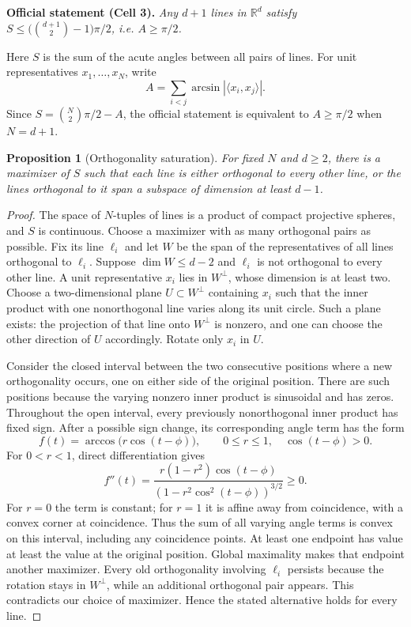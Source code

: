 \documentclass[11pt]{article}
\newtheorem{proposition}{Proposition}
\begin{document}
\noindent\textbf{Official statement (Cell 3).}
\emph{Any $d+1$ lines in $\mathbb R^d$ satisfy
$S\leq\bigl(\binom{d+1}{2}-1\bigr)\pi/2$, i.e. $A\geq\pi/2$.}

\bigskip
\noindent Here $S$ is the sum of the acute angles between all pairs
of lines.  For unit representatives $x_1,\ldots,x_N$, write
\[
 A=\sum_{i<j}\arcsin|\langle x_i,x_j\rangle|.
\]
Since $S=\binom N2\pi/2-A$, the official statement is equivalent to
$A\geq\pi/2$ when $N=d+1$.

\begin{proposition}[Orthogonality saturation]
For fixed $N$ and $d\geq2$, there is a maximizer of $S$ such that
each line is either orthogonal to every other line, or the lines
orthogonal to it span a subspace of dimension at least $d-1$.
\end{proposition}
\begin{proof}
The space of $N$-tuples of lines is a product of compact projective
spheres, and $S$ is continuous.  Choose a maximizer with as many
orthogonal pairs as possible.  Fix its line $\ell_i$ and let $W$ be
the span of the representatives of all lines orthogonal to $\ell_i$.
Suppose $\dim W\leq d-2$ and $\ell_i$ is not orthogonal to every other
line.  A unit representative $x_i$ lies in $W^\perp$, whose dimension
is at least two.  Choose a two-dimensional plane $U\subset W^\perp$
containing $x_i$ such that the inner product with one nonorthogonal
line varies along its unit circle.  Such a plane exists: the
projection of that line onto $W^\perp$ is nonzero, and one can choose
the other direction of $U$ accordingly.  Rotate only $x_i$ in $U$.

Consider the closed interval between the two consecutive positions
where a new orthogonality occurs, one on either side of the original
position.  There are such positions because the varying nonzero
inner product is sinusoidal and has zeros.  Throughout the open
interval, every previously nonorthogonal inner product has fixed
sign.  After a possible sign change, its corresponding angle term
has the form
\[
 f(t)=\arccos\bigl(r\cos(t-\phi)\bigr),\qquad
 0\leq r\leq1,\quad \cos(t-\phi)>0.
\]
For $0<r<1$, direct differentiation gives
\[
 f''(t)=\frac{r(1-r^2)\cos(t-\phi)}
 {(1-r^2\cos^2(t-\phi))^{3/2}}\geq0.
\]
For $r=0$ the term is constant; for $r=1$ it is affine away from
coincidence, with a convex corner at coincidence.  Thus the sum of
all varying angle terms is convex on this interval, including any
coincidence points.  At least one endpoint has value at least the
value at the original position.  Global maximality makes that
endpoint another maximizer.  Every old orthogonality involving
$\ell_i$ persists because the rotation stays in $W^\perp$, while
an additional orthogonal pair appears.  This contradicts our choice
of maximizer.  Hence the stated alternative holds for every line.
\end{proof}
\end{document}

